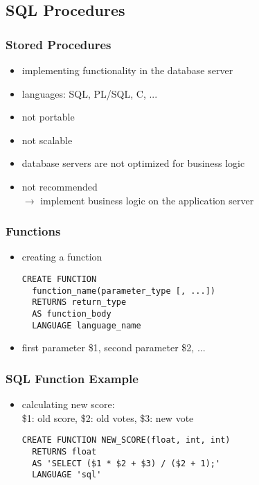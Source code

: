 \documentclass[dvipsnames]{beamer}
\theoremstyle{plain}
\begin{document}
\subsection{SQL Procedures}

\lstset{language=ExtendedSQL}

\begin{frame}
  \frametitle{Stored Procedures}

  \begin{itemize}
    \item implementing functionality in the database server
    \item languages: SQL, PL/SQL, C, ...

    \pause
    \bigskip
    \item not portable
    \item not scalable
    \item database servers are not optimized for business logic
    \pause
    \item \alert{not recommended}\\
      $\rightarrow$ implement business logic on the application server
  \end{itemize}
\end{frame}

\begin{frame}[fragile]
  \frametitle{Functions}

  \begin{itemize}
    \item creating a function
    \begin{lstlisting}
CREATE FUNCTION
  function_name(parameter_type [, ...])
  RETURNS return_type
  AS function_body
  LANGUAGE language_name
    \end{lstlisting}

    \medskip
    \item first parameter \$1, second parameter \$2, ...
  \end{itemize}
\end{frame}

\begin{frame}[fragile]
  \frametitle{SQL Function Example}

  \begin{itemize}
    \item calculating new score:\\
      \$1: old score, \$2: old votes, \$3: new vote

    \medskip
    \begin{lstlisting}
CREATE FUNCTION NEW_SCORE(float, int, int)
  RETURNS float
  AS 'SELECT ($1 * $2 + $3) / ($2 + 1);'
  LANGUAGE 'sql'
    \end{lstlisting}
  \end{itemize}
\end{frame}
\end{document}
